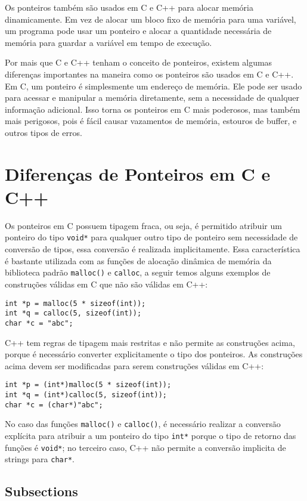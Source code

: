 \documentclass[12pt]{article}
\begin{document}
Os ponteiros também são usados em C e C++ para alocar memória dinamicamente. Em vez de alocar um bloco fixo de memória para uma variável, um programa pode usar um ponteiro e alocar a quantidade necessária de memória para guardar a variável em tempo de execução.

Por mais que C e C++ tenham o conceito de ponteiros, existem algumas diferenças importantes na maneira como os ponteiros são usados em C e C++. Em C, um ponteiro é simplesmente um endereço de memória. Ele pode ser usado para acessar e manipular a memória diretamente, sem a necessidade de qualquer informação adicional. Isso torna os ponteiros em C mais poderosos, mas também mais perigosos, pois é fácil causar vazamentos de memória, estouros de buffer, e outros tipos de erros.

\section{Diferenças de Ponteiros em C e C++}

Os ponteiros em C possuem tipagem fraca, ou seja, é permitido atribuir um ponteiro do tipo \texttt{void*} para qualquer outro tipo de ponteiro sem necessidade de conversão de tipos, essa conversão é realizada implicitamente. Essa característica é bastante utilizada com as funções de alocação dinâmica de memória da biblioteca padrão \texttt{malloc()} e \texttt{calloc}, a seguir temos alguns exemplos de construções válidas em C que não são válidas em C++:
\begin{verbatim}
int *p = malloc(5 * sizeof(int));
int *q = calloc(5, sizeof(int));
char *c = "abc";
\end{verbatim}

C++ tem regras de tipagem mais restritas e não permite as construções acima, porque é necessário converter explicitamente o tipo dos ponteiros. As construções acima devem ser modificadas para serem construções válidas em C++:
\begin{verbatim}
int *p = (int*)malloc(5 * sizeof(int));
int *q = (int*)calloc(5, sizeof(int));
char *c = (char*)"abc";
\end{verbatim}

No caso das funções \texttt{malloc()} e \texttt{calloc()}, é necessário realizar a conversão explícita para atribuir a um ponteiro do tipo \texttt{int*} porque o tipo de retorno das funções é \texttt{void*}; no terceiro caso, C++ não permite a conversão implicita de strings para \texttt{char*}.

\subsection{Subsections}
\end{document}
